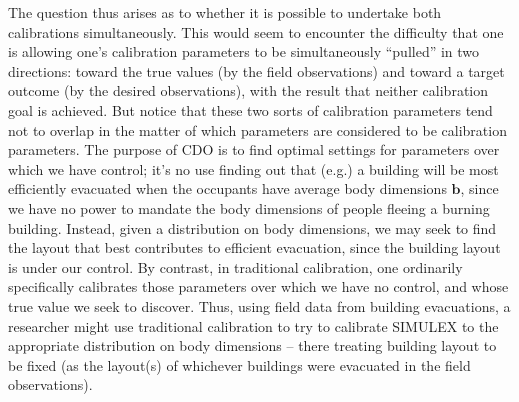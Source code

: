 \documentclass{article}
\begin{document}
The question thus arises as to whether it is possible to undertake both calibrations simultaneously. This would seem to encounter the difficulty that one is allowing one's calibration parameters to be simultaneously ``pulled'' in two directions: toward the true values (by the field observations) and toward a target outcome (by the desired observations), with the result that neither calibration goal is achieved. But notice that these two sorts of calibration parameters tend not to overlap in the matter of which parameters are considered to be calibration parameters. The purpose of CDO is to find optimal settings for parameters over which we have control; it's no use finding out that (e.g.) a building will be most efficiently evacuated when the occupants have average body dimensions $\mathbf b$, since we have no power to mandate the body dimensions of people fleeing a burning building. Instead, given a distribution on body dimensions, we may seek to find the layout that best contributes to efficient evacuation, since the building layout is under our control. By contrast, in traditional calibration, one ordinarily specifically calibrates those parameters over which we have no control, and whose true value we seek to discover. Thus, using field data from building evacuations, a researcher might use traditional calibration to try to calibrate SIMULEX to the appropriate distribution on body dimensions -- there treating building layout to be fixed (as the layout(s) of whichever buildings were evacuated in the field observations).

\end{document}
